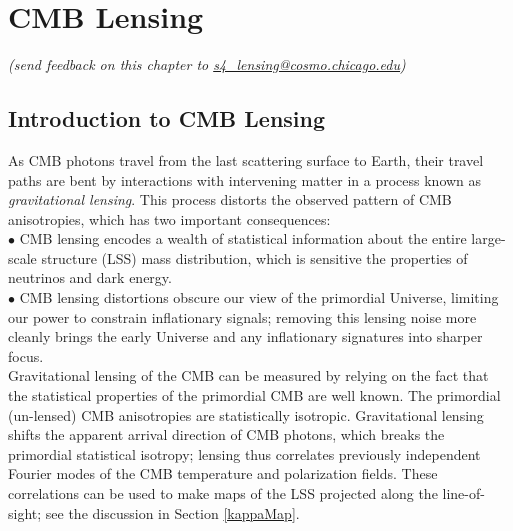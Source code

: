  
\chapter{CMB Lensing}

\begin{center}
{\small \it (send feedback on this chapter to \href{mailto:s4_lensing@cosmo.chicago.edu}{s4\_lensing@cosmo.chicago.edu})}
\end{center}



\def\nnu{N_{\mathrm eff}}
\def\gtrsim{\raise-.75ex\hbox{$\buildrel>\over\sim$}}
\section{Introduction to CMB Lensing}
\label{sec:lensing_intro}

As CMB photons travel from the last scattering surface to Earth, their travel paths are bent by interactions with intervening matter in a process known as \textit{gravitational lensing}.
This process distorts the observed pattern of CMB anisotropies, which has two important consequences:\\
 
$\bullet$ CMB lensing encodes a wealth of statistical information about the entire large-scale structure (LSS) mass distribution, which is sensitive the properties of neutrinos and dark energy.\\

$\bullet$ CMB lensing distortions obscure our view of the primordial Universe, limiting our power to constrain inflationary signals; removing this lensing noise more cleanly brings the early Universe and any inflationary signatures into sharper focus.\\


Gravitational lensing of the CMB can be measured by relying on the fact that the statistical properties of the primordial CMB are well known.
The primordial (un-lensed) CMB anisotropies are statistically isotropic.
Gravitational lensing shifts the apparent arrival direction of CMB photons, which breaks the primordial statistical isotropy;
lensing thus correlates previously independent Fourier modes of the CMB temperature and polarization fields.
These correlations can be used to make maps of the LSS projected along the line-of-sight; see the discussion in Section \ref{kappaMap}.


